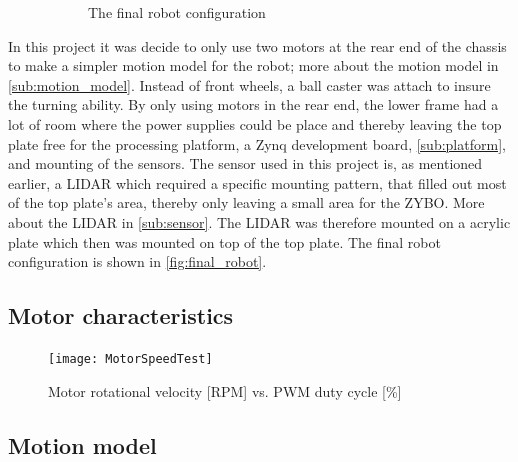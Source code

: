 \documentclass[Main]{subfiles}
\begin{document}
\begin{figure}[H]
\begin{subfigure}[b]{0.4\linewidth}
				\caption{The final robot configuration}
				\label{fig:final_robot}
			\end{subfigure}
		\caption{}
		\label{fig:robots}
		\end{figure}
		In this project it was decide to only use two motors at the rear end of the chassis to make a simpler motion model for the robot; more about the motion model in \autoref{sub:motion_model}. 
		Instead of front wheels, a ball caster was attach to insure the turning ability. 
		By only using motors in the rear end, the lower frame had a lot of room where the power supplies could be place and thereby leaving the top plate free for the processing platform, a Zynq development board, \autoref{sub:platform}, and mounting of the sensors. 
		The sensor used in this project is, as mentioned earlier, a LIDAR which required a specific mounting pattern, that filled out most of the top plate's area, thereby only leaving a small area for the ZYBO. 
		More about the LIDAR in \autoref{sub:sensor}.
		The LIDAR was therefore mounted on a acrylic plate which then was mounted on top of the top plate. 
		The final robot configuration is shown in \autoref{fig:final_robot}.
		

	\subsection{Motor characteristics} %
	\label{sub:motor_characteristics}

		

		\begin{figure}[H]
			\centering
			\texttt{[image: MotorSpeedTest]}
			\caption{Motor rotational velocity [RPM] vs. PWM duty cycle [\%]}
			\label{fig:motor_speed_test}
		\end{figure}
		

	\subsection{Motion model} %
	\label{sub:motion_model}
\end{document}
